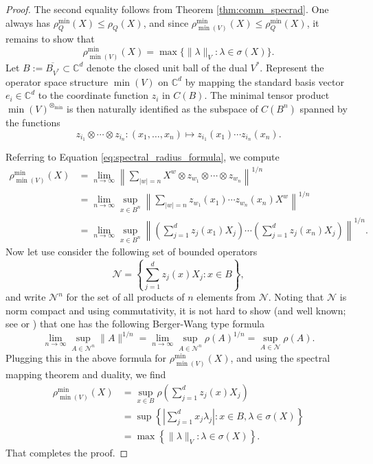 \documentclass[12pt]{amsart}
\numberwithin{equation}{section}
\theoremstyle{definition}
\newcommand{\cN}{\mathcal{N}}
\newcommand{\bC}{\mathbb{C}}
\newcommand{\ol}{\overline}
\begin{document}
\begin{proof}
The second equality follows from Theorem \ref{thm:comm_specrad}. 
One always has $\rho_Q^{\min}(X) \leq \rho_Q(X)$, and since $\rho_{\min(V)}^{\min}(X) \leq \rho_{Q}^{\min}(X)$, it remains to show that 
\[
\rho_{\min(V)}^{\min}(X) = \max\{\|\lambda\|_V : \lambda \in \sigma(X) \}.
\]
Let $B:= \ol{B_{V^*}} \subset \bC^d$ denote the closed unit ball of the dual $V^*$. 
Represent the operator space structure $\min(V)$ on $\bC^d$ by mapping the standard basis vector $e_i \in \bC^d$ to the coordinate function $z_i$ in $C(B)$. 
The minimal tensor product $\min(V)^{\otimes_{\min}}$ is then naturally identified as the subspace of $C(B^n)$ spanned by the functions 
\[
z_{i_1} \otimes \cdots \otimes z_{i_n} \colon (x_1, \ldots, x_n) \mapsto z_{i_1}(x_1) \cdots z_{i_n}(x_n). 
\]

Referring to Equation \eqref{eq:spectral_radius_formula}, we compute 
\begin{align*}
\rho^{\min}_{\min(V)}(X) &= \lim_{n \to \infty} \left \|\sum_{|w|=n} X^w \otimes z_{w_1} \otimes \cdots \otimes z_{w_n} \right\|^{1/n} \\
&= \lim_{n \to \infty} \sup_{x \in B^n}\left \|\sum_{|w|=n}  z_{w_1}(x_1)  \cdots z_{w_n}(x_n) X^w \right\|^{1/n} \\
&= \lim_{n \to \infty} \sup_{x \in B^n} \left\|\left( \sum_{j=1}^d  z_{j}(x_1) X_j\right)  \cdots \left( \sum_{j=1}^d  z_{j}(x_n) X_j\right) \right\|^{1/n}. 
\end{align*}
Now let use consider the following set of bounded operators
\[
\cN = \left\{ \sum_{j=1}^d  z_{j}(x) X_j : x \in B\right\}, 
\]
and write $\cN^n$ for the set of all products of $n$ elements from $\cN$. 
Noting that $\cN$ is norm compact and using commutativity, it is not hard to show (and well known; see \cite{soltysiak1993joint} or \cite[Lemma 2.8]{shulman2002formulae}) that one has the following Berger-Wang type formula
\begin{equation}\label{eq:BW}
\lim_{n \to \infty} \sup_{A \in \cN^n}\|A\|^{1/n} = \lim_{n \to \infty} \sup_{A \in \cN^n}\rho(A)^{1/n} = \sup_{A \in \cN}\rho(A). 
\end{equation}
Plugging this in the above formula for $\rho^{\min}_{\min(V)}(X)$, and using the spectral mapping theorem and duality, we find 
\begin{align*}
\rho^{\min}_{\min(V)}(X) &= \sup_{x \in B}\rho\left( \sum_{j=1}^d  z_{j}(x) X_j \right) \\
&= \sup \left\{ \left|\sum_{j=1}^d x_j \lambda_j \right|  : x \in B, \lambda \in \sigma(X) \right\} \\
&= \max\left\{\|\lambda\|_V : \lambda \in \sigma(X) \right\}. 
\end{align*}
That completes the proof. 
\end{proof}
\end{document}
